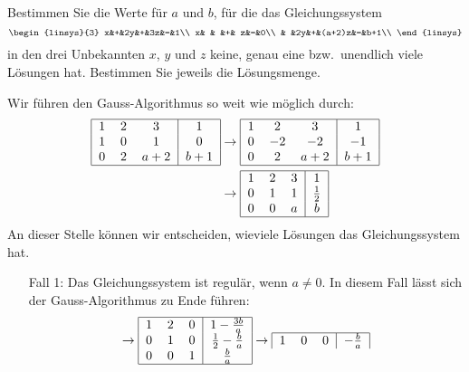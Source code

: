 Bestimmen Sie die Werte für $a$ und $b$, für die das Gleichungssystem
\[
\begin{linsys}{3}
x&+&2y&+&3z&=&1\\
x& &  &+& z&=&0\\
 & &2y&+&(a+2)z&=&b+1\\
\end{linsys}
\]
in den drei Unbekannten $x$, $y$ und $z$ keine, genau eine bzw.~unendlich
viele Lösungen hat. Bestimmen Sie jeweils die Lösungsmenge.


\begin{loesung}
Wir führen den Gauss-Algorithmus so weit wie möglich durch:
\begin{align*}
\begin{tabular}{|ccc|c|}
\hline
1&2&3&1\\
1&0&1&0\\
0&2&$a+2$&$b+1$\\
\hline
\end{tabular}
&\rightarrow
\begin{tabular}{|ccc|c|}
\hline
1&2&3&1\\
0&$-2$&$-2$&$-1$\\
0&2&$a+2$&$b+1$\\
\hline
\end{tabular}
\\
&\rightarrow
\begin{tabular}{|ccc|c|}
\hline
1&2&3&1\\
0&1&1&$\frac12$\\
0&0&$a$&$b$\\
\hline
\end{tabular}
\end{align*}
An dieser Stelle können wir entscheiden, wieviele Lösungen das Gleichungssystem
hat.
\begin{enumerate}
\item[Fall 1:]
Das Gleichungssystem ist regulär, wenn $a\ne 0$. In diesem Fall lässt sich der
Gauss-Algorithmus zu Ende führen:
\[
\rightarrow
\begin{tabular}{|ccc|c|}
\hline
1&2&0&$1-\frac{3b}{a}$\\
0&1&0&$\frac12-\frac{b}{a}$\\
0&0&1&$\frac{b}{a}$\\
\hline
\end{tabular}
\rightarrow
\begin{tabular}{|ccc|c|}
\hline
1&0&0&$-\frac{b}{a}$\\

\end{tabular}\]
\end{enumerate}
\end{loesung}
